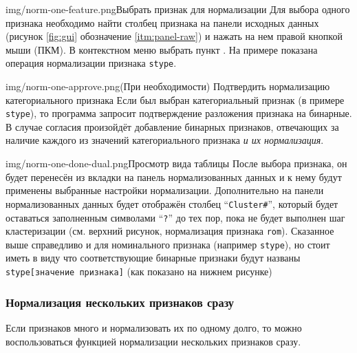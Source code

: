 \documentclass[12pt,tikz]{instruction}
\begin{document}
\begin{steps}
	\begin{ist}{img/norm-one-feature.png}{Выбрать признак для нормализации}
		Для выбора одного признака необходимо найти столбец признака на панели исходных данных (рисунок \ref{fig:gui} обозначение 	\ref{itm:panel-raw}) и нажать на нем правой кнопкой мыши (ПКМ). В контекстном меню выбрать пункт . На примере показана операция нормализации признака \texttt{stype}.
	\end{ist}
	
	\begin{ist}{img/norm-one-approve.png}{(При необходимости) Подтвердить нормализацию категориального признака}
		Если был выбран категориальный признак (в примере \texttt{stype}), то программа запросит подтверждение разложения признака на бинарные. В случае согласия произойдёт добавление бинарных признаков, отвечающих за наличие каждого из значений категориального признака \textit{ и их нормализация}.
	\end{ist}
		
	\begin{ist}{img/norm-one-done-dual.png}{Просмотр вида таблицы}
		После выбора признака, он будет перенесён из вкладки на панель нормализованных данных и к нему будут применены выбранные настройки нормализации. Дополнительно на панели нормализованных данных будет отображён столбец ``\texttt{Cluster\#}'', который будет оставаться заполненным символами ``\texttt{?}'' до тех пор, пока не будет выполнен шаг кластеризации (см. верхний рисунок, нормализация признака \texttt{rom}). Сказанное выше справедливо и для номинального признака (например \texttt{stype}), но стоит иметь в виду что соответствующие бинарные признаки будут названы \texttt{stype[значение признака]} (как показано на нижнем рисунке)
	\end{ist}
		
\end{steps}

\newpage
\subsubsection{Нормализация нескольких признаков сразу}

Если признаков много и нормализовать их по одному долго, то можно воспользоваться функцией нормализации нескольких признаков сразу.
\end{document}

